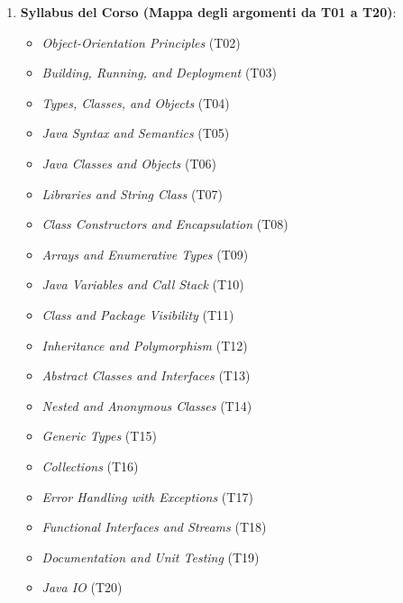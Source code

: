\documentclass[11pt,a4paper]{article}
\providecommand{\tightlist}{\setlength{\itemsep}{0pt}\setlength{\parskip}{0pt}}
\begin{document}
\begin{enumerate}
  \begin{itemize}
  \tightlist
  \item
    \textbf{Formato}: Prova pratica al calcolatore in \textbf{Aula
    Delta} (ambiente Linux/IDE).
  \item
    \textbf{Contenuto}: Risoluzione di una serie di esercizi di
    programmazione in linguaggio Java (sviluppo classi, gerarchie a
    oggetti, implementazione interfacce, algoritmi su collezioni,
    gestione eccezioni, test con asserzioni/JUnit).
  \item
    \textbf{Voto finale}: Somma algebrica dei punti ottenuti nei singoli
    esercizi.
  \item
    È prevista una \textbf{simulazione d'esame} ufficiale a fine corso.
  \end{itemize}
\item
  \textbf{Syllabus del Corso (Mappa degli argomenti da T01 a T20)}:

  \begin{itemize}
  \tightlist
  \item
    \emph{Object-Orientation Principles} (T02)
  \item
    \emph{Building, Running, and Deployment} (T03)
  \item
    \emph{Types, Classes, and Objects} (T04)
  \item
    \emph{Java Syntax and Semantics} (T05)
  \item
    \emph{Java Classes and Objects} (T06)
  \item
    \emph{Libraries and String Class} (T07)
  \item
    \emph{Class Constructors and Encapsulation} (T08)
  \item
    \emph{Arrays and Enumerative Types} (T09)
  \item
    \emph{Java Variables and Call Stack} (T10)
  \item
    \emph{Class and Package Visibility} (T11)
  \item
    \emph{Inheritance and Polymorphism} (T12)
  \item
    \emph{Abstract Classes and Interfaces} (T13)
  \item
    \emph{Nested and Anonymous Classes} (T14)
  \item
    \emph{Generic Types} (T15)
  \item
    \emph{Collections} (T16)
  \item
    \emph{Error Handling with Exceptions} (T17)
  \item
    \emph{Functional Interfaces and Streams} (T18)
  \item
    \emph{Documentation and Unit Testing} (T19)
  \item
    \emph{Java IO} (T20)
  \end{itemize}
\end{enumerate}
\end{document}
